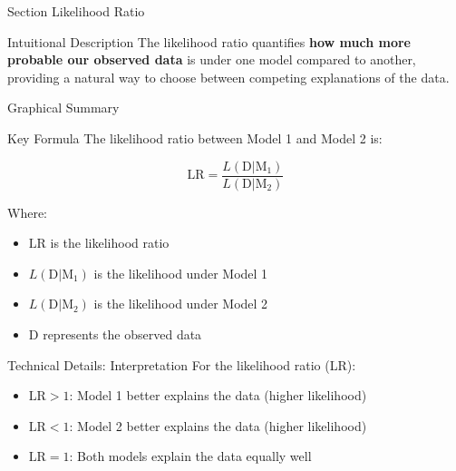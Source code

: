 
\begin{frame}{Section}
\centering
\Huge{Likelihood Ratio}
\end{frame}


\begin{frame}{Intuitional Description}
The likelihood ratio quantifies \textbf{how much more probable our observed data} is under one model compared to another, providing a natural way to choose between competing explanations of the data.
\end{frame}

\begin{frame}{Graphical Summary}

\end{frame}


\begin{frame}{Key Formula}
The likelihood ratio between Model 1 and Model 2 is:

$$\text{LR} = \frac{L(\text{D}|\text{M}_1)}{L(\text{D}|\text{M}_2)}$$

Where:
\begin{itemize}
\item $\text{LR}$ is the likelihood ratio
\item $L(\text{D}|\text{M}_1)$ is the likelihood under Model 1
\item $L(\text{D}|\text{M}_2)$ is the likelihood under Model 2
\item $\text{D}$ represents the observed data
\end{itemize}
\end{frame}


\begin{frame}{Technical Details: Interpretation}
For the likelihood ratio (LR):
\begin{itemize}
\item $\text{LR} > 1$: Model 1 better explains the data (higher likelihood)
\item $\text{LR} < 1$: Model 2 better explains the data (higher likelihood)
\item $\text{LR} = 1$: Both models explain the data equally well
\end{itemize}

\end{frame}

